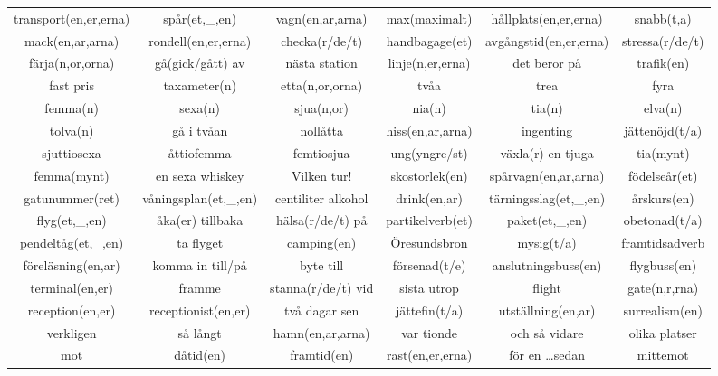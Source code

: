\begin{center}
    \begin{adjustwidth}{-2.7cm}{}
        \begin{tabular}{|c c c c c c|}
            \hline
            transport(en,er,erna) & spår(et,\_,en) & vagn(en,ar,arna) & max(maximalt) & hållplats(en,er,erna) & snabb(t,a) \\
            mack(en,ar,arna) & rondell(en,er,erna) & checka(r/de/t) & handbagage(et) & avgångstid(en,er,erna) & stressa(r/de/t) \\
            färja(n,or,orna) & gå(gick/gått) av & nästa station & linje(n,er,erna) & det beror på & trafik(en) \\
            fast pris & taxameter(n) & etta(n,or,orna) & tvåa & trea & fyra \\
            femma(n) & sexa(n) & sjua(n,or) & nia(n) & tia(n) & elva(n)  \\
            tolva(n) & gå i tvåan & nollåtta & hiss(en,ar,arna) & ingenting & jättenöjd(t/a) \\
            sjuttiosexa & åttiofemma & femtiosjua & ung(yngre/st) & växla(r) en tjuga & tia(mynt) \\
            femma(mynt) & en sexa whiskey & Vilken tur! & skostorlek(en) & spårvagn(en,ar,arna) & födelseår(et) \\
            gatunummer(ret) & våningsplan(et,\_,en) & centiliter alkohol & drink(en,ar) & tärningsslag(et,\_,en) & årskurs(en) \\
            flyg(et,\_,en) & åka(er) tillbaka & hälsa(r/de/t) på & partikelverb(et) & paket(et,\_,en) & obetonad(t/a) \\
            pendeltåg(et,\_,en) & ta flyget & camping(en) & Öresundsbron & mysig(t/a) & framtidsadverb \\
            föreläsning(en,ar) & komma in till/på & byte till & försenad(t/e) & anslutningsbuss(en) & flygbuss(en) \\
            terminal(en,er) & framme & stanna(r/de/t) vid & sista utrop & flight & gate(n,r,rna) \\
            reception(en,er) & receptionist(en,er) & två dagar sen & jättefin(t/a) & utställning(en,ar) & surrealism(en) \\
            verkligen & så långt & hamn(en,ar,arna) & var tionde & och så vidare & olika platser \\
            mot & dåtid(en) & framtid(en) & rast(en,er,erna) & för en \ldots sedan & mittemot \\

\end{tabular}
\end{adjustwidth}
\end{center}
